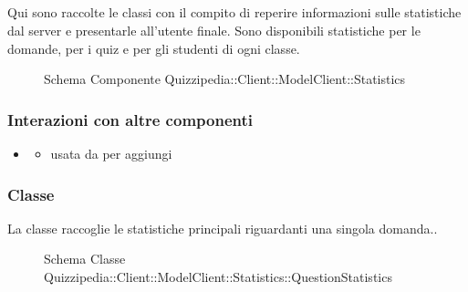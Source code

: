 \subsection{}
Qui sono raccolte le classi con il compito di reperire informazioni sulle statistiche dal server e presentarle all'utente finale. Sono disponibili statistiche per le domande, per i quiz e per gli studenti di ogni classe.
\begin{figure}[H]
\centering
\noindent{}
\caption[Schema Componente Quizzipedia::Client::ModelClient::Statistics]{Schema Componente Quizzipedia::Client::ModelClient::Statistics}
\end{figure}
\subsubsection{Interazioni con altre componenti}
\begin{itemize}
\item {}
\begin{itemize}
\item usata da  per aggiungi
\end{itemize}
\end{itemize}
\subsubsection{Classe }
La classe raccoglie le statistiche principali riguardanti una singola domanda..
\begin{figure}[H]
\centering
\noindent{}
\caption[Schema Classe QuestionStatistics]{Schema Classe Quizzipedia::Client::ModelClient::Statistics::QuestionStatistics}
\end{figure}
